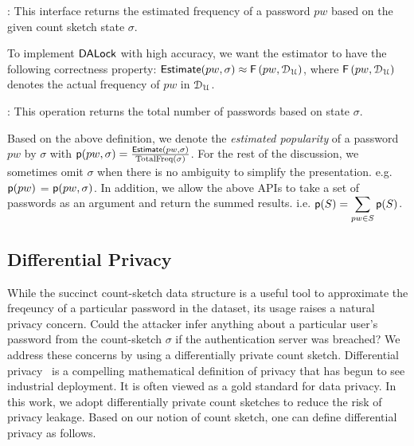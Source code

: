 : This interface returns the estimated frequency of a password $pw$ based on the given count sketch state $\sigma$.


To implement $\mathsf{DALock}$ with high accuracy, we want the estimator to have the following correctness property: $\textsf{Estimate}(pw,\sigma) \approx \mathsf{F}\left(pw, \mathcal{D}_{{\mathcal{U}}} \right)$, where $\mathsf{F}\left(pw, \mathcal{D}_{{\mathcal{U}}}\right)$ denotes the actual frequency of $pw$ in $\mathcal{D}_{{\mathcal{U}}}$.


: This operation returns the total number of passwords based on state $\sigma$.


Based on the above definition, we denote the \emph{estimated popularity} of a password $pw$ by $\sigma$ with $\textsf{p}(pw,\sigma) = \frac{\textsf{Estimate}(pw,\sigma)}{\text{TotalFreq}(\sigma)}$. For the rest of the discussion, we sometimes omit $\sigma$ when there is no ambiguity to simplify the presentation. e.g. $\textsf{p}(pw)$ = $\textsf{p}(pw,\sigma)$. In addition, we allow the above APIs to take a set of passwords as an argument and return the summed results. i.e. $\textsf{p}(S) = \displaystyle{\sum_{pw \in S} \textsf{p}(S)}$. 




\vspace*{-\baselineskip}

\subsection{Differential Privacy} \label{section:Prelinmaries-DiffernetialPrivacy}
\vspace*{-\baselineskip}
While the succinct count-sketch data structure is a useful tool to approximate the freqeuncy of a particular password in the dataset, its usage raises a natural privacy concern. Could the attacker infer anything about a particular user's password from the count-sketch $\sigma$ if the authentication server was breached? We address these concerns by using a differentially private count sketch. Differential privacy~\cite{ECS:Dwork11} is a compelling mathematical definition of privacy that has begun to see industrial deployment\cite{CCS:ErlPihKor14}. It is often viewed as a gold standard for data privacy.  In this work, we adopt differentially private count sketches to reduce the risk of privacy leakage. Based on our notion of count sketch, one can define differential privacy as follows.

